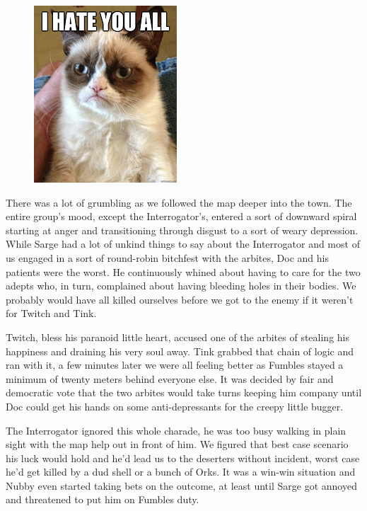 \begin{figure}
	\begin{center}
		\includegraphics[width=\figwidth]{pics/9/22.png}
	\end{center}
\end{figure}
There was a lot of grumbling as we followed the map deeper into the town. 
The entire group's mood, except the Interrogator's, entered a sort of downward spiral starting at anger and transitioning through disgust to a sort of weary depression. 
While Sarge had a lot of unkind things to say about the Interrogator and most of us engaged in a sort of round-robin bitchfest with the arbites, Doc and his patients were the worst. 
He continuously whined about having to care for the two adepts who, in turn, complained about having bleeding holes in their bodies. 
We probably would have all killed ourselves before we got to the enemy if it weren't for Twitch and Tink.

Twitch, bless his paranoid little heart, accused one of the arbites of stealing his happiness and draining his very soul away. 
Tink grabbed that chain of logic and ran with it, a few minutes later we were all feeling better as Fumbles stayed a minimum of twenty meters behind everyone else. 
It was decided by fair and democratic vote that the two arbites would take turns keeping him company until Doc could get his hands on some anti-depressants for the creepy little bugger. 


The Interrogator ignored this whole charade, he was too busy walking in plain sight with the map help out in front of him. 
We figured that best case scenario his luck would hold and he'd lead us to the deserters without incident, worst case he'd get killed by a dud shell or a bunch of Orks. 
It was a win-win situation and Nubby even started taking bets on the outcome, at least until Sarge got annoyed and threatened to put him on Fumbles duty.

